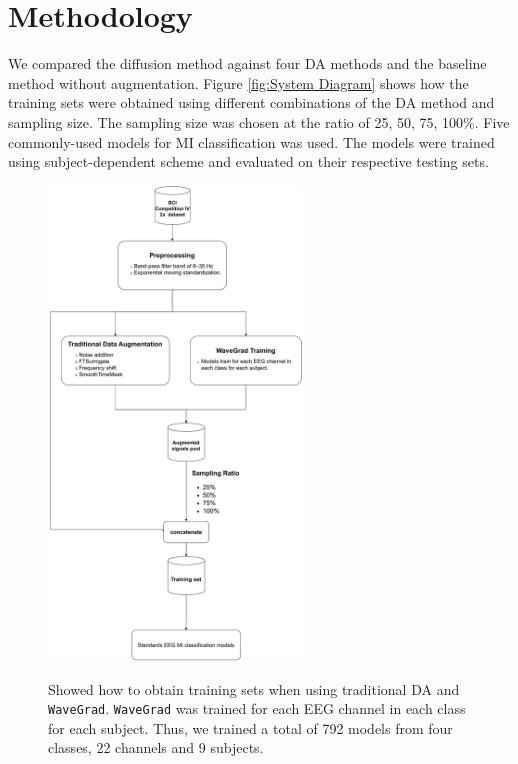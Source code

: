\documentclass[runningheads]{llncs}
\begin{document}
\section{Methodology}
We compared the diffusion method against four DA methods and the baseline method without augmentation. Figure \ref{fig:System Diagram} shows how the training sets were obtained using different combinations of the DA method and sampling size.  The sampling size was chosen at the ratio of 25, 50, 75, 100\%.  Five commonly-used models for MI classification was used. The models were trained using subject-dependent scheme and evaluated on their respective testing sets. 

\begin{figure}[ht]
  \centering
  \caption[System Diagram]{\label{fig:System Diagram} Showed how to obtain training sets when using traditional DA and \texttt{WaveGrad}. \texttt{WaveGrad} was trained for each EEG channel in each class for each subject. Thus, we trained a total of 792 models from four classes, 22 channels and 9 subjects.}
  \includegraphics[width=0.6\textwidth]{fig/dyagram.pdf}
  \label{fig:System}
\end{figure}
\end{document}
